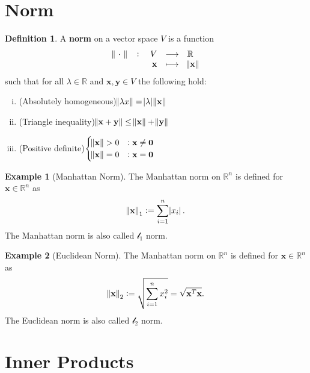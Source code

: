 \documentclass[12pt,openany]{book}
\theoremstyle{definition}
\newtheorem{definition}{Definition}[chapter]
\newtheorem{example}{Example}[chapter]
\newcommand{\R}{\mathbb{R}}
\begin{document}
	\section{Norm}
	\begin{tcolorbox}[colframe=defcolor,title={\color{white}\bf Norm}]
		\begin{definition}
			A \textbf{norm} on a vector space \(V\) is a function \[
			\fullfunction{\norm{\ \cdot\ }}{V}{\R}{\textbf{x}}{\norm{\textbf{x}}}
			\] such that for all \(\lambda\in\R\) and \(\textbf{x},\textbf{y}\in V\) the following hold: \begin{enumerate}[(i)]
				\item (Absolutely homogeneous)\quad \(\norm{\lambda x}=\abs{\lambda}\norm{\textbf{x}}\)
				\item (Triangle inequality)\quad \(\norm{\textbf{x}+\textbf{y}}\leq\norm{\textbf{x}}+\norm{\textbf{y}}\)
				\item (Positive definite)\quad \(
				\begin{cases}
					\norm{\textbf{x}}> 0&:\textbf{x}\neq\textbf{0}\\
					\norm{\textbf{x}}=0&:\textbf{x}=\textbf{0}
				\end{cases}\)
			\end{enumerate}
		\end{definition}
	\end{tcolorbox}
	\vspace{8pt}
	\begin{example}[Manhattan Norm]
		The Manhattan norm on $\R^n$ is defined for $\textbf{x}\in\R^n$ as $$\norm{\textbf{x}}_1:=\sum_{i=1}^n\abs{x_i}.$$ The Manhattan norm is also called \(\mathscr{l}_1\) norm.
	\end{example}
	\begin{example}[Euclidean Norm]
		The Manhattan norm on $\R^n$ is defined for $\textbf{x}\in\R^n$ as $$\norm{\textbf{x}}_2:=\sqrt{\sum_{i=1}^nx_i^2}=\sqrt{\textbf{x}^T\textbf{x}}.$$ The Euclidean norm is also called \(\mathscr{l}_2\) norm.
	\end{example}

	\section{Inner Products}
\end{document}
